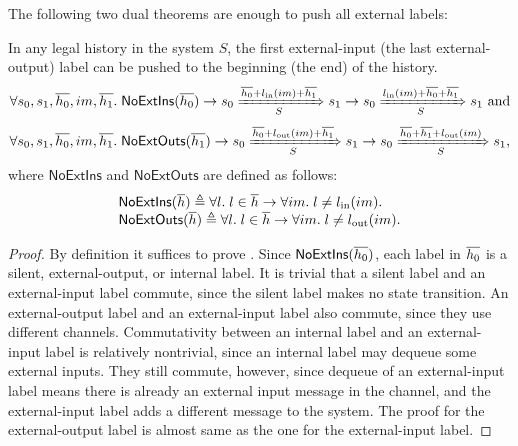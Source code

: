 The following two dual theorems are enough to push all external labels:
\begin{theorem}
  \label{thm-push-ext-labels}
  In any legal history in the system $S$, the first external-input (the last external-output) label can be pushed to the beginning (the end) of the history.
  \begin{displaymath}
    \forall s_0, s_1, \listof{h_0}, im, \listof{h_1}.\;
    \mathsf{NoExtIns}(\listof{h_0}) \to
    \semsteps{S}{s_0}{\listapp{\listcons{\listof{h_0}}{\lblIns{im}}}{\listof{h_1}}}{s_1} \to
    \semsteps{S}{s_0}{\listapp{\lblIns{im}}{\listapp{\listof{h_0}}{\listof{h_1}}}}{s_1}\ \textrm{and}
  \end{displaymath}
  \begin{displaymath}
    \forall s_0, s_1, \listof{h_0}, im, \listof{h_1}.\;
    \mathsf{NoExtOuts}(\listof{h_1}) \to
    \semsteps{S}{s_0}{\listapp{\listcons{\listof{h_0}}{\lblOuts{im}}}{\listof{h_1}}}{s_1} \to
    \semsteps{S}{s_0}{\listapp{\listapp{\listof{h_0}}{\listof{h_1}}}{\lblOuts{im}}}{s_1},
  \end{displaymath}
  where $\mathsf{NoExtIns}$ and $\mathsf{NoExtOuts}$ are defined as follows:
  \begin{displaymath}
    \begin{array}{l}
      \mathsf{NoExtIns}(\listof{h}) \triangleq \forall l.\; l \in \listof{h} \to \forall im.\; l \neq \lblIns{im}.\\
      \mathsf{NoExtOuts}(\listof{h}) \triangleq \forall l.\; l \in \listof{h} \to \forall im.\; l \neq \lblOuts{im}.
    \end{array}
  \end{displaymath}
\end{theorem}
\begin{proof}
  By definition it suffices to prove .
  Since $\mathsf{NoExtIns}(\listof{h_0})$, each label in $\listof{h_0}$ is a silent, external-output, or internal label.
  It is trivial that a silent label and an external-input label commute, since the silent label makes no state transition.
  An external-output label and an external-input label also commute, since they use different channels.
  Commutativity between an internal label and an external-input label is relatively nontrivial, since an internal label may dequeue some external inputs.
  They still commute, however, since dequeue of an external-input label means there is already an external input message in the channel, and the external-input label adds a different message to the system.
  The proof for the external-output label is almost same as the one for the external-input label.
\end{proof}

